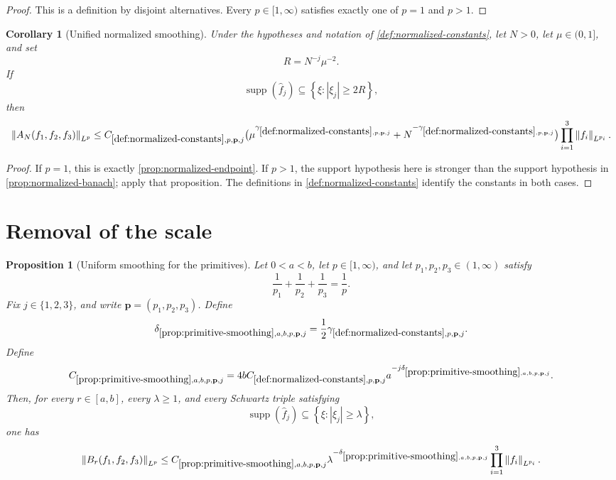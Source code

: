 \documentclass[11pt]{article}
\newtheorem{proposition}[theorem]{Proposition}
\newtheorem{corollary}[theorem]{Corollary}
\newcommand{\supp}{\operatorname{supp}}
\newcommand{\norm}[2]{\left\lVert #1\right\rVert_{#2}}
\newcommand{\Cst}[2]{C_{\ref{#1},#2}}
\newcommand{\Exp}[2]{\delta_{\ref{#1},#2}}
\newcommand{\Gam}[2]{\gamma_{\ref{#1},#2}}
\newcommand{\abs}[1]{\left|#1\right|}
\newcommand{\set}[1]{\left\{#1\right\}}
\newcommand{\indices}{\{1,2,3\}}
\begin{document}
	\begin{proof}
		This is a definition by disjoint alternatives.  Every \(p\in[1,\infty)\) satisfies exactly one of \(p=1\) and \(p>1\).
	\end{proof}
	
	\begin{corollary}[Unified normalized smoothing]\label{cor:normalized-smoothing}
		Under the hypotheses and notation of \cref{def:normalized-constants}, let \(N>0\), let \(\mu\in(0,1]\), and set
		\[
		R=N^{-j}\mu^{-2}.
		\]
		If
		\[
		\supp(\widehat f_j)\subseteq\set{\xi:\abs{\xi_j}\geq2R},
		\]
		then
		\[
		\norm{A_N(f_1,f_2,f_3)}{L^p}
		\leq
		\Cst{def:normalized-constants}{p,\mathbf p,j}
		\bigl(\mu^{\Gam{def:normalized-constants}{p,\mathbf p,j}}
		+N^{-\Gam{def:normalized-constants}{p,\mathbf p,j}}\bigr)
		\prod_{i=1}^{3}\norm{f_i}{L^{p_i}}.
		\]
	\end{corollary}
	
	\begin{proof}
		If \(p=1\), this is exactly \cref{prop:normalized-endpoint}.  If \(p>1\), the support hypothesis here is stronger than the support hypothesis in \cref{prop:normalized-banach}; apply that proposition.  The definitions in \cref{def:normalized-constants} identify the constants in both cases.
	\end{proof}
	
	\section{Removal of the scale}
	
	\begin{proposition}[Uniform smoothing for the primitives]\label{prop:primitive-smoothing}
		Let \(0<a<b\), let \(p\in[1,\infty)\), and let \(p_1,p_2,p_3\in(1,\infty)\) satisfy
		\[
		\frac1{p_1}+\frac1{p_2}+\frac1{p_3}=\frac1p.
		\]
		Fix \(j\in\indices\), and write \(\mathbf p=(p_1,p_2,p_3)\).  Define
		\[
		\Exp{prop:primitive-smoothing}{a,b,p,\mathbf p,j}
		=
		\frac12\Gam{def:normalized-constants}{p,\mathbf p,j}.
		\]
		Define
		\[
		\Cst{prop:primitive-smoothing}{a,b,p,\mathbf p,j}
		=
		4b\Cst{def:normalized-constants}{p,\mathbf p,j}
		a^{-j\Exp{prop:primitive-smoothing}{a,b,p,\mathbf p,j}}.
		\]
		Then, for every \(r\in[a,b]\), every \(\lambda\geq1\), and every Schwartz triple satisfying
		\[
		\supp(\widehat f_j)\subseteq\set{\xi:\abs{\xi_j}\geq\lambda},
		\]
		one has
		\[
		\norm{B_r(f_1,f_2,f_3)}{L^p}
		\leq
		\Cst{prop:primitive-smoothing}{a,b,p,\mathbf p,j}
		\lambda^{-\Exp{prop:primitive-smoothing}{a,b,p,\mathbf p,j}}
		\prod_{i=1}^{3}\norm{f_i}{L^{p_i}}.
		\]
	\end{proposition}
	
\end{document}

